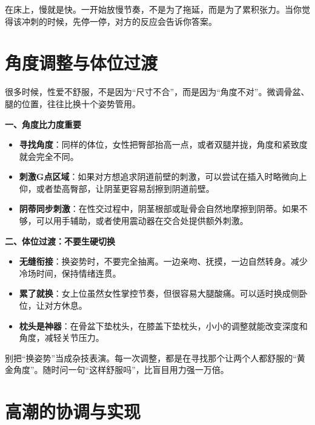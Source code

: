 \documentclass[12pt,UTF8]{ctexbook}
\begin{document}
\begin{tcolorbox}[colback=pink!5!white,colframe=red!50!black,title=贴心小叮咛]
在床上，慢就是快。一开始放慢节奏，不是为了拖延，而是为了累积张力。当你觉得该冲刺的时候，先停一停，对方的反应会告诉你答案。
\end{tcolorbox}

\section{角度调整与体位过渡}

很多时候，性爱不舒服，不是因为“尺寸不合”，而是因为“角度不对”。微调骨盆、腿的位置，往往比换十个姿势管用。

\textbf{一、角度比力度重要}

\begin{itemize}
\item \textbf{寻找角度}：同样的体位，女性把臀部抬高一点，或者双腿并拢，角度和紧致度就会完全不同。
\item \textbf{刺激G点区域}：如果对方想追求阴道前壁的刺激，可以尝试在插入时略微向上仰，或者垫高臀部，让阴茎更容易刮擦到阴道前壁。
\item \textbf{阴蒂同步刺激}：在性交过程中，阴茎根部或耻骨会自然地摩擦到阴蒂。如果不够，可以用手辅助，或者使用震动器在交合处提供额外刺激。
\end{itemize}

\textbf{二、体位过渡：不要生硬切换}

\begin{itemize}
\item \textbf{无缝衔接}：换姿势时，不要完全抽离。一边亲吻、抚摸，一边自然转身。减少冷场时间，保持情绪连贯。
\item \textbf{累了就换}：女上位虽然女性掌控节奏，但很容易大腿酸痛。可以适时换成侧卧位，让对方休息。
\item \textbf{枕头是神器}：在骨盆下垫枕头，在膝盖下垫枕头，小小的调整就能改变深度和角度，减轻关节压力。
\end{itemize}

\begin{tcolorbox}[colback=pink!5!white,colframe=red!50!black,title=贴心小叮咛]
别把“换姿势”当成杂技表演。每一次调整，都是在寻找那个让两个人都舒服的“黄金角度”。随时问一句“这样舒服吗”，比盲目用力强一万倍。
\end{tcolorbox}

\section{高潮的协调与实现}
\end{document}
